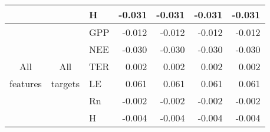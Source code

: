 \begin{table}[htbp]
\begin{center}
\begin{tabular}{|l|l|l|r|r|r|r|}
    \multicolumn{ 1}{|l|}{} & \multicolumn{ 1}{l|}{} &  H & -0.031 & -0.031 & -0.031 & -0.031 \\ \hline

    \multicolumn{ 1}{|c|}{} & \multicolumn{ 1}{c|}{} & GPP& -0.012 & -0.012 & -0.012 & -0.012 \\ \cline{ 3- 6}

    \multicolumn{ 1}{|c|}{} & \multicolumn{ 1}{l|}{} & NEE & -0.030 & -0.030 & -0.030 & -0.030 \\ \cline{ 3- 6}

    \multicolumn{ 1}{|c|}{All} & \multicolumn{ 1}{c|}{All} & TER & 0.002 & 0.002 & 0.002 & 0.002 \\ \cline{ 3- 6}

    \multicolumn{ 1}{|c|}{features} & \multicolumn{ 1}{c|}{targets} & LE & 0.061 & 0.061 & 0.061 & 0.061 \\ \cline{ 3- 6}

    \multicolumn{ 1}{|l|}{} & \multicolumn{ 1}{l|}{} & Rn & -0.002 & -0.002 & -0.002 & -0.002 \\ \cline{ 3- 6}

    \multicolumn{ 1}{|l|}{} & \multicolumn{ 1}{l|}{} & H & -0.004 & -0.004 & -0.004 & -0.004 \\ \hline

\end{tabular}

\end{center}

\label{results}

\end{table}

